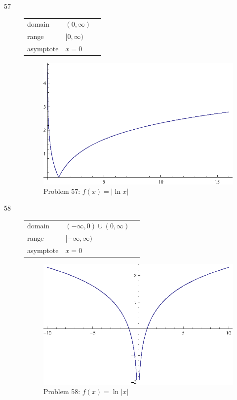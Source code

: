 \documentclass{exam}
\begin{document}
\begin{description}
    \item[57]
      \begin{tabular}[h]{lll}
        \toprule
        domain    & $(0, \infty)$ \\
        range     & $[0, \infty)$ \\
        asymptote & $x = 0$ \\
        \bottomrule
      \end{tabular}

      \begin{figure}[h]
        \centering
        \includegraphics[scale = 0.9]{problem57.eps}
        \caption{Problem 57: $f(x) = | \ln x |$}
      \end{figure}

    \item[58]
      \begin{tabular}[h]{lll}
        \toprule
        domain    & $(-\infty, 0) \cup (0, \infty)$ \\
        range     & $[-\infty, \infty)$ \\
        asymptote & $x = 0$ \\
        \bottomrule
      \end{tabular}

      \begin{figure}[h]
        \centering
        \includegraphics[scale = 0.9]{problem58.eps}
        \caption{Problem 58: $f(x) = \ln |x|$}
      \end{figure}


\end{description}
\end{document}
